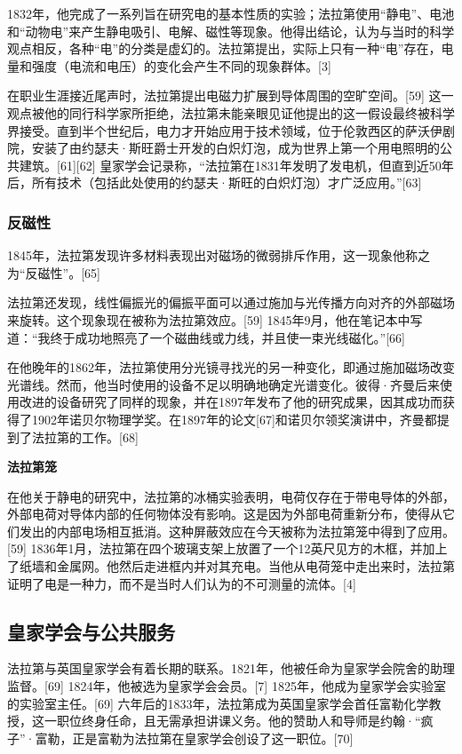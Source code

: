 1832年，他完成了一系列旨在研究电的基本性质的实验；法拉第使用“静电”、电池和“动物电”来产生静电吸引、电解、磁性等现象。他得出结论，认为与当时的科学观点相反，各种“电”的分类是虚幻的。法拉第提出，实际上只有一种“电”存在，电量和强度（电流和电压）的变化会产生不同的现象群体。[3]

在职业生涯接近尾声时，法拉第提出电磁力扩展到导体周围的空旷空间。[59] 这一观点被他的同行科学家所拒绝，法拉第未能亲眼见证他提出的这一假设最终被科学界接受。直到半个世纪后，电力才开始应用于技术领域，位于伦敦西区的萨沃伊剧院，安装了由约瑟夫·斯旺爵士开发的白炽灯泡，成为世界上第一个用电照明的公共建筑。[61][62] 皇家学会记录称，“法拉第在1831年发明了发电机，但直到近50年后，所有技术（包括此处使用的约瑟夫·斯旺的白炽灯泡）才广泛应用。”[63]
\subsubsection{反磁性}
1845年，法拉第发现许多材料表现出对磁场的微弱排斥作用，这一现象他称之为“反磁性”。[65]

法拉第还发现，线性偏振光的偏振平面可以通过施加与光传播方向对齐的外部磁场来旋转。这个现象现在被称为法拉第效应。[59] 1845年9月，他在笔记本中写道：“我终于成功地照亮了一个磁曲线或力线，并且使一束光线磁化。”[66]

在他晚年的1862年，法拉第使用分光镜寻找光的另一种变化，即通过施加磁场改变光谱线。然而，他当时使用的设备不足以明确地确定光谱变化。彼得·齐曼后来使用改进的设备研究了同样的现象，并在1897年发布了他的研究成果，因其成功而获得了1902年诺贝尔物理学奖。在1897年的论文[67]和诺贝尔领奖演讲中，齐曼都提到了法拉第的工作。[68]

\textbf{法拉第笼}  

在他关于静电的研究中，法拉第的冰桶实验表明，电荷仅存在于带电导体的外部，外部电荷对导体内部的任何物体没有影响。这是因为外部电荷重新分布，使得从它们发出的内部电场相互抵消。这种屏蔽效应在今天被称为法拉第笼中得到了应用。[59] 1836年1月，法拉第在四个玻璃支架上放置了一个12英尺见方的木框，并加上了纸墙和金属网。他然后走进框内并对其充电。当他从电荷笼中走出来时，法拉第证明了电是一种力，而不是当时人们认为的不可测量的流体。[4]
\subsection{皇家学会与公共服务}
法拉第与英国皇家学会有着长期的联系。1821年，他被任命为皇家学会院舍的助理监督。[69] 1824年，他被选为皇家学会会员。[7] 1825年，他成为皇家学会实验室的实验室主任。[69] 六年后的1833年，法拉第成为英国皇家学会首任富勒化学教授，这一职位终身任命，且无需承担讲课义务。他的赞助人和导师是约翰·“疯子”·富勒，正是富勒为法拉第在皇家学会创设了这一职位。[70]

